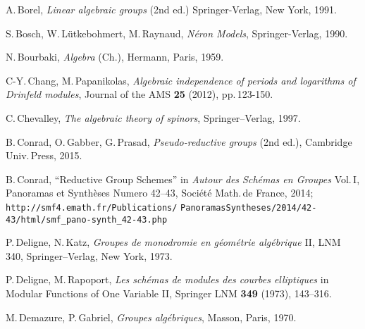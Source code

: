 \documentclass[10pt]{article}
\newcommand{\Z}{\mathscr{Z}}
\renewcommand{\(}{\left(}
\renewcommand{\)}{\right)}
\numberwithin{thm}{subsection}
\begin{document}
\begin{thebibliography}{BBBB}


 A.\,Borel, {\em Linear algebraic groups}  
(2nd ed.) Springer-Verlag, New York, 1991.

 S.\,Bosch, W.\,L\"utkebohmert, M.\,Raynaud, {\em N\'eron Models}, Springer-Verlag, 1990.


 N.\,Bourbaki, {\em Algebra} (Ch.), Hermann, Paris, 1959. 


%
%


 C-Y.\,Chang, M.\,Papanikolas, {\em Algebraic independence of periods
and logarithms of Drinfeld modules}, Journal of the AMS {\bf 25} (2012), pp.\,123-150.


 C.\,Chevalley, {\em The algebraic theory of spinors},
Springer--Verlag, 1997. 


 B.\,Conrad, O.\,Gabber, G.\,Prasad, {\em Pseudo-reductive groups} (2nd ed.), Cambridge
Univ.\,Press, 2015.

 B.\,Conrad, ``Reductive Group Schemes'' in {\em Autour des Sch\'emas en Groupes} Vol.\,I, 
Panoramas et Synth\`eses Numero 42--43, Soci\'et\'e Math.\,de France, 2014; {\tt{http://smf4.emath.fr/Publications/}}
{\tt{PanoramasSyntheses/2014/42-43/html/smf\_pano-synth\_42-43.php}}

%


 P.\,Deligne, N.\,Katz, {\em Groupes de monodromie en g\'eom\'etrie alg\'ebrique} II, 
LNM 340, Springer--Verlag, New York, 1973. 

 P.\,Deligne, M.\,Rapoport, {\em Les sch\'emas de modules des courbes elliptiques}
in Modular Functions of One Variable II, Springer LNM {\bf 349} (1973), 143--316.

 M.\,Demazure, P.\,Gabriel, {\em Groupes alg\'ebriques}, Masson, Paris, 1970.



\end{thebibliography}
\end{document}
